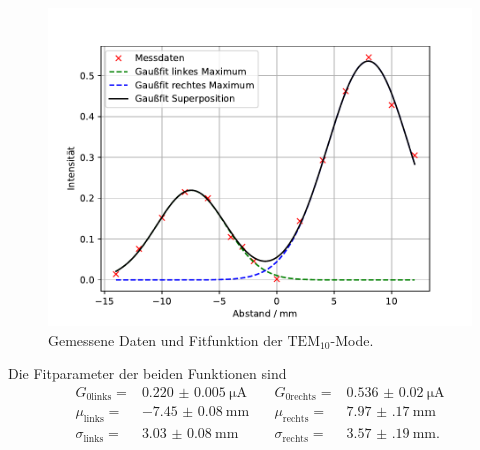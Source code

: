 \begin{figure}
  \centering
  \includegraphics[width = \textwidth, keepaspectratio]{figure/TEM01.pdf}
  \caption{Gemessene Daten und Fitfunktion der $\text{TEM}_{10}$-Mode.}
\end{figure}
\FloatBarrier
Die Fitparameter der beiden Funktionen sind 
\begin{align*}
G_{0 \text{links}}=&\SI{0.220(5)}{\micro\ampere}\quad &G_{0 \text{rechts}}=&\SI{0.536(20)}{\micro\ampere}\\
\mu_{\text{links}} =& \SI{-7.45(8)}{\milli\meter}\quad &\mu_{\text{rechts}} =& \SI{7.97(17)}{\milli\meter}\\
\sigma_{\text{links}} =& \SI{3.03(8)}{\milli\meter}\quad &\sigma_{\text{rechts}} =& \SI{3.57(19)}{\milli\meter}.
\end{align*}
